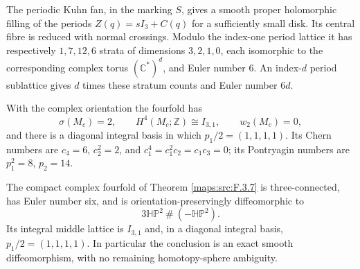 \begin{theorem}\label{night:P1.9}
The periodic Kuhn fan, in the marking $S$, gives a smooth proper
holomorphic filling of the periods $Z(q)=sI_3+C(q)$ for a sufficiently
small disk.  Its central fibre is reduced with normal crossings.
Modulo the index-one period lattice it has respectively $1,7,12,6$
strata of dimensions $3,2,1,0$, each isomorphic to the corresponding
complex torus $(\mathbb C^*)^d$, and Euler number $6$.
An index-$d$ period sublattice gives $d$ times these stratum counts and
Euler number $6d$.
\end{theorem}

\begin{theorem}\label{night:P1.13}
With the complex orientation the fourfold has
\[
\sigma(M_c)=2,\qquad H^4(M_c;\mathbb Z)\cong I_{3,1},\qquad
w_2(M_c)=0,
\]
and there is a diagonal integral basis in which
$p_1/2=(1,1,1,1)$.
Its Chern numbers are
$c_4=6$, $c_2^2=2$, and
$c_1^4=c_1^2c_2=c_1c_3=0$; its Pontryagin numbers are
$p_1^2=8$, $p_2=14$.
\end{theorem}

\begin{theorem}\label{maps:src:F.4.1}


The compact complex fourfold of Theorem \ref{maps:src:F.3.7} is three-connected,
has Euler number six, and is orientation-preservingly diffeomorphic to
\[
 3\mathbb H\mathbb P^2\ \#\ (-\mathbb H\mathbb P^2).
 \tag{F.25}\label{maps:eq:F.25}
\]
Its integral middle lattice is $I_{3,1}$ and, in a diagonal integral
basis, $p_1/2=(1,1,1,1)$.  In particular the conclusion is an exact
smooth diffeomorphism, with no remaining homotopy-sphere ambiguity.

\end{theorem}

